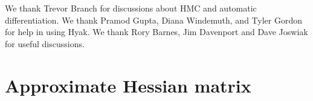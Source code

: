 \documentclass[fleqn,usenatbib]{mnras} %
\begin{document}
We thank Trevor Branch for discussions about HMC and automatic differentiation.
We thank Pramod Gupta, Diana Windemuth, and Tyler Gordon for help in
using Hyak.  We thank Rory Barnes, Jim Davenport and Dave Joswiak for useful discussions.











\appendix

\section{Approximate Hessian matrix} \label{sec:hessian}
\end{document}

